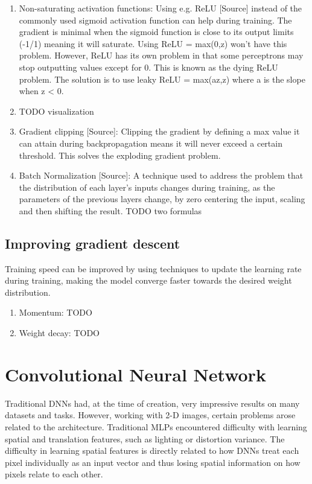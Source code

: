 \documentclass[english, bibtex]{kththesis}
\begin{document}
\begin{enumerate}
\item Non-saturating activation functions: Using e.g. ReLU [Source] instead of the commonly used sigmoid activation function can help during training. The gradient is minimal when the sigmoid function is close to its output limits (-1/1) meaning it will saturate. Using ReLU = max(0,z) won't have this problem. However, ReLU has its own problem in that some perceptrons may stop outputting values except for 0. This is known as the dying ReLU problem. The solution is to use leaky ReLU = max(az,z) where a is the slope when z < 0. 

\item TODO visualization

\item Gradient clipping [Source]: Clipping the gradient by defining a max value it can attain during backpropagation means it will never exceed a certain threshold. This solves the exploding gradient problem.

\item Batch Normalization [Source]: A technique used to address the problem that the distribution of each layer’s inputs changes during training, as the parameters of the previous layers change, by zero centering the input, scaling and then shifting the result. TODO two formulas

\end{enumerate}
\subsection{Improving gradient descent}

Training speed can be improved by using techniques to update the learning rate during training, making the model converge faster towards the desired weight distribution.
\begin{enumerate}
\item Momentum: TODO
\item Weight decay: TODO
\end{enumerate}


\section{Convolutional Neural Network}

Traditional DNNs had, at the time of creation, very impressive results on many datasets and tasks. However, working with 2-D images, certain problems arose related to the architecture. Traditional MLPs encountered difficulty with learning spatial and translation features, such as lighting or distortion variance. The difficulty in learning spatial features is directly related to how DNNs treat each pixel individually as an input vector and thus losing spatial information on how pixels relate to each other.
\end{document}
